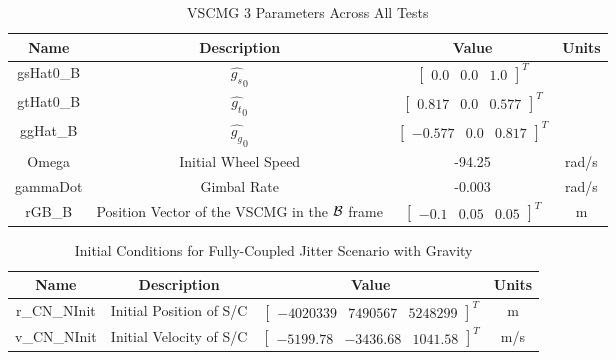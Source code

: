 \begin{table}[htbp]
	\caption{VSCMG 3 Parameters Across All Tests}
	\label{tab:rw1}
	\centering \fontsize{10}{10}\selectfont
	\begin{tabular}{ c | c | c | c } %
		\hline
		\textbf{Name}  & \textbf{Description}  & \textbf{Value} & \textbf{Units} \\
		\hline
		gsHat0\_B &  $\hat{g_s}_0$ & $\begin{bmatrix}
		0.0 & 0.0 & 1.0 \end{bmatrix}^T$ & \\
		gtHat0\_B &  $\hat{g_t}_0$ & $\begin{bmatrix}
		0.817 & 0.0 & 0.577 \end{bmatrix}^T$ & \\
		ggHat\_B &  $\hat{g_g}_0$ & $\begin{bmatrix}
		-0.577 & 0.0 & 0.817 \end{bmatrix}^T$ & \\
		Omega & Initial Wheel Speed & -94.25 & rad/s \\
		gammaDot & Gimbal Rate & -0.003 & rad/s\\
		rGB\_B & Position Vector of the VSCMG in the $\cal{B}$ frame & $\begin{bmatrix}
		-0.1 & 0.05 & 0.05 \end{bmatrix}^T$ & m \\
		\hline
	\end{tabular}
\end{table}

\begin{table}[htbp]
	\caption{Initial Conditions for Fully-Coupled Jitter Scenario with Gravity}
	\label{tab:initial}
	\centering \fontsize{10}{10}\selectfont
	\begin{tabular}{ c | c | c | c } %
		\hline
		\textbf{Name}  & \textbf{Description}  & \textbf{Value} & \textbf{Units} \\
		\hline
		r\_CN\_NInit & Initial Position of S/C & $\begin{bmatrix}
		-4020339 &	7490567 & 5248299 
		\end{bmatrix}^T$ & m \\
		v\_CN\_NInit & Initial Velocity of S/C & $\begin{bmatrix}
		-5199.78 & -3436.68 & 1041.58
		\end{bmatrix}^T$ & m/s \\
		\hline
	\end{tabular}
\end{table}

